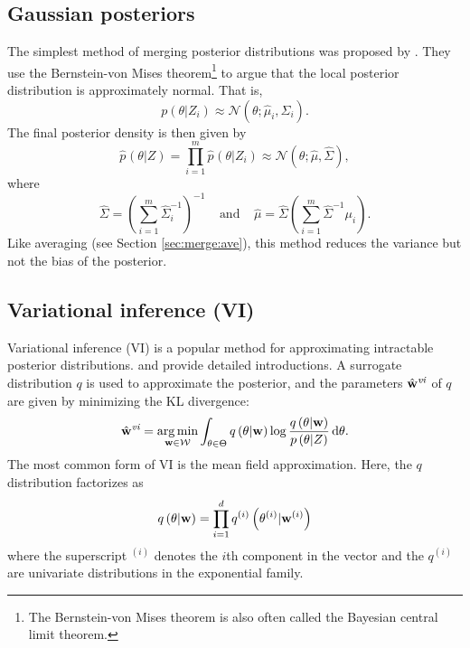 \documentclass[thesis.tex]{subfiles}
\newcommand{\q}[1]{q\left({#1}\right)}
\newcommand{\qi}[1]{q^{(i)}\left({#1}\right)}
\newcommand{\p}[1]{p\left({#1}\right)}
\newcommand{\psup}[2]{\hat p^{#1}({#2})}
\newcommand{\phat}[1]{\psup{}{#1}}
\newcommand{\gaussian}[3]{\mathcal N({#1};{#2},{#3})}
\newcommand{\wvi}{\hat\w^\textit{vi}}
\begin{document}

\subsection{Gaussian posteriors}

The simplest method of merging posterior distributions was proposed by \cite{neiswanger2014asymptotically}.
They use the Bernstein-von Mises theorem\footnote{
    The Bernstein-von Mises theorem is also often called the Bayesian central limit theorem.
}
to argue that the local posterior distribution is approximately normal.
That is,
\begin{equation}
    \p{\theta | Z_i}
    \approx
    \gaussian{\theta}{\hat\mu_i}{\hat\Sigma_i}
    .
\end{equation}
The final posterior density is then given by
\begin{equation}
    \phat{\theta | Z}
    =
    \prod_{i=1}^m
    \phat{\theta | Z_i}
    \approx
    \gaussian{\theta}{\hat\mu}{\hat\Sigma}
    ,
\end{equation}
where
\begin{equation}
    \hat\Sigma
    =
    \left(
        \sum_{i=1}^m
        \hat\Sigma_i^{-1}
    \right)^{-1}
    ~~~~~\text{and}~~~~~
    \hat\mu
    =
    \hat\Sigma \left(\sum_{i=1}^m \hat\Sigma^{-1} \mu_i \right)
    .
\end{equation}
Like averaging (see Section \ref{sec:merge:ave}),
this method reduces the variance but not the bias of the posterior.


\subsection{Variational inference (VI)}
\label{sec:merge:vi}

Variational inference (VI) is a popular method for approximating intractable posterior distributions.
\cite{jordan1999introduction} and \cite{blei2017variational} provide detailed introductions.
A surrogate distribution $q$ is used to approximate the posterior,
and the parameters $\wvi$ of $q$ are given by minimizing the KL divergence: 
\begin{equation}
    \wvi = \argmin_{\w\in\W} \int_{\theta\in\Theta}\q{\theta | \w}\log\frac{\q{\theta | \w}}{\p{\theta | Z}}
    \dd\theta
    .
\end{equation}
The most common form of VI is the mean field approximation.
Here, the $q$ distribution factorizes as
\begin{equation}
    \q{\theta|\w} = \prod_{i=1}^d \qi{\theta^{(i)}|\w^{(i)}}
\end{equation}
where the superscript ${}^{(i)}$ denotes the $i$th component in the vector and
the $q^{(i)}$ are univariate distributions in the exponential family.
\end{document}
